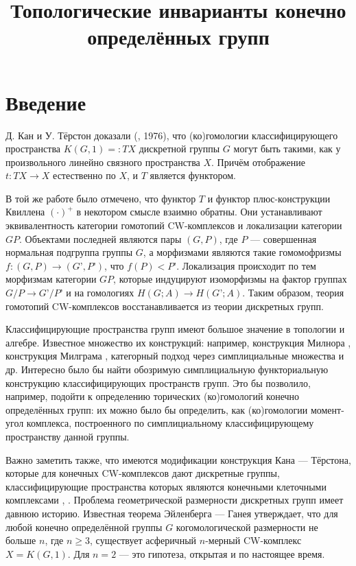 \documentclass[14pt, dvipsnames]{extarticle}
\title{Топологические инварианты конечно определённых групп}
\date{}
\theoremstyle{definition}
\theoremstyle{remark}
\begin{document}
\maketitle

\section{Введение}

Д. Кан и У. Тёрстон доказали (\cite{Kan}, 1976), что (ко)гомологии классифицирующего пространства $K(G, 1)=:TX$ дискретной группы $G$ могут быть такими, как у произвольного линейно связного пространства $X$. Причём отображение $t: TX \to X$ естественно по $X$, и $T$ является функтором.

В той же работе было отмечено, что функтор $T$ и функтор плюс-конструкции Квиллена $(\cdot)^+$ в некотором смысле взаимно обратны. Они устанавливают эквивалентность категории гомотопий CW-комплексов и локализации категории $GP$. Объектами последней являются пары $(G, P)$, где $P$ — совершенная нормальная подгруппа группы $G$, а морфизмами являются такие гомомофризмы $f: (G, P) \to (G’, P’)$, что $f(P) < P’$. Локализация происходит по тем морфизмам категории $GP$, которые индуцируют изоморфизмы на фактор группах $G/P \to G’/P’$ и на гомологиях $H(G; A) \to H(G’; A)$. Таким образом, теория гомотопий CW-комплексов восстанавливается из теории дискретных групп.   

Классифицирующие пространства групп имеют большое значение в топологии и алгебре. Известное множество их конструкций: например, конструкция Милнора \cite{MilnorBar}, конструкция Милграма \cite{Milgram}, категорный подход через симплициальные множества \cite{Lenz} и др. Интересно было бы найти обозримую симплициальную функториальную конструкцию классифицирующих пространств групп. Это бы позволило, например, подойти к определению торических (ко)гомологий конечно определённых групп: их можно было бы определить, как (ко)гомологии момент-угол комплекса, построенного по симплициальному классифицирующему пространству данной группы. 

Важно заметить также, что имеются модификации конструкция Кана --- Тёрстона, которые для конечных CW-комплексов дают дискретные группы, классифицирующие пространства которых являются конечными клеточными комплексами \cite{BDH}, \cite{Maunder}. Проблема геометрической размерности дискретных групп имеет давнюю историю. Известная теорема Эйленберга --- Ганея \cite{Ganea} утверждает, что для любой конечно определённой группы $G$ когомологической размерности не больше $n$, где $n ≥ 3$, существует асферичный $n$-мерный CW-комплекс $X = K(G, 1)$. Для $n = 2$ — это гипотеза, открытая и по настоящее время.
\end{document}
